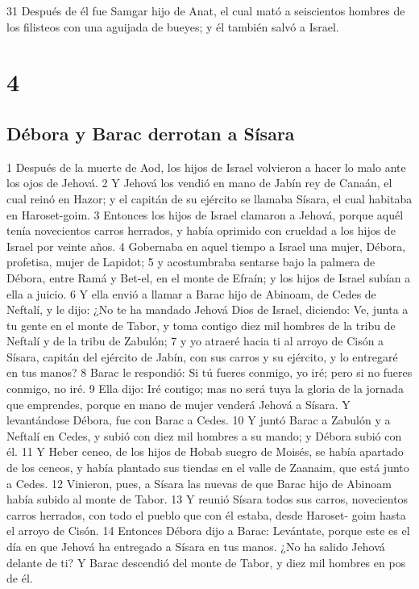 31 Después de él fue Samgar hijo de Anat, el cual mató a seiscientos hombres de los filisteos con una aguijada de bueyes; y él también salvó a Israel.

\chapter{4}

\section*{Débora y Barac derrotan a Sísara}


1 Después de la muerte de Aod, los hijos de Israel volvieron a hacer lo malo ante los ojos de Jehová.
2 Y Jehová los vendió en mano de Jabín rey de Canaán, el cual reinó en Hazor; y el capitán de su ejército se llamaba Sísara, el cual habitaba en Haroset-goim.
3 Entonces los hijos de Israel clamaron a Jehová, porque aquél tenía novecientos carros herrados, y había oprimido con crueldad a los hijos de Israel por veinte años.
4 Gobernaba en aquel tiempo a Israel una mujer, Débora, profetisa, mujer de Lapidot;
5 y acostumbraba sentarse bajo la palmera de Débora, entre Ramá y Bet-el, en el monte de Efraín; y los hijos de Israel subían a ella a juicio.
6 Y ella envió a llamar a Barac hijo de Abinoam, de Cedes de Neftalí, y le dijo: ¿No te ha mandado Jehová Dios de Israel, diciendo: Ve, junta a tu gente en el monte de Tabor, y toma contigo diez mil hombres de la tribu de Neftalí y de la tribu de Zabulón;
7 y yo atraeré hacia ti al arroyo de Cisón a Sísara, capitán del ejército de Jabín, con sus carros y su ejército, y lo entregaré en tus manos?
8 Barac le respondió: Si tú fueres conmigo, yo iré; pero si no fueres conmigo, no iré.
9 Ella dijo: Iré contigo; mas no será tuya la gloria de la jornada que emprendes, porque en mano de mujer venderá Jehová a Sísara. Y levantándose Débora, fue con Barac a Cedes.
10 Y juntó Barac a Zabulón y a Neftalí en Cedes, y subió con diez mil hombres a su mando; y Débora subió con él.
11 Y Heber ceneo, de los hijos de Hobab suegro de Moisés, se había apartado de los ceneos, y había plantado sus tiendas en el valle de Zaanaim, que está junto a Cedes.
12 Vinieron, pues, a Sísara las nuevas de que Barac hijo de Abinoam había subido al monte de Tabor.
13 Y reunió Sísara todos sus carros, novecientos carros herrados, con todo el pueblo que con él estaba, desde Haroset- goim hasta el arroyo de Cisón.
14 Entonces Débora dijo a Barac: Levántate, porque este es el día en que Jehová ha entregado a Sísara en tus manos. ¿No ha salido Jehová delante de ti? Y Barac descendió del monte de Tabor, y diez mil hombres en pos de él.
